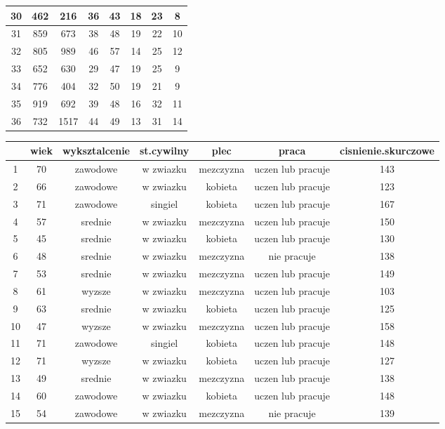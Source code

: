\documentclass[12pt]{report}\usepackage[]{graphicx}\usepackage[]{color}
\begin{document}
\begin{table}[ht!]
\begin{tabular}{c|c|c|c|c|c|c|c}
 \hline
30 & 462& 216& 36& 43& 18& 23& 8 \\
 \hline
31 & 859& 673& 38& 48& 19& 22& 10 \\
 \hline
32 & 805& 989& 46& 57& 14& 25& 12 \\
 \hline
33 & 652& 630& 29& 47& 19& 25& 9 \\
 \hline
34 & 776& 404& 32& 50& 19& 21& 9 \\
 \hline
35 & 919& 692& 39& 48& 16& 32& 11 \\
 \hline
36 & 732& 1517& 44& 49& 13& 31& 14 \\
 \end{tabular}
\end{table}\begin{table}[ht!]
\centering
 \begin{tabular}{c|c|c|c|c|c|c} 
 &  wiek & wyksztalcenie & st.cywilny & plec & praca & cisnienie.skurczowe \\ \hline
1 & 70& zawodowe& w zwiazku& mezczyzna& uczen lub pracuje& 143 \\
 \hline
2 & 66& zawodowe& w zwiazku& kobieta& uczen lub pracuje& 123 \\
 \hline
3 & 71& zawodowe& singiel& kobieta& uczen lub pracuje& 167 \\
 \hline
4 & 57& srednie& w zwiazku& mezczyzna& uczen lub pracuje& 150 \\
 \hline
5 & 45& srednie& w zwiazku& kobieta& uczen lub pracuje& 130 \\
 \hline
6 & 48& srednie& w zwiazku& mezczyzna& nie pracuje& 138 \\
 \hline
7 & 53& srednie& w zwiazku& mezczyzna& uczen lub pracuje& 149 \\
 \hline
8 & 61& wyzsze& w zwiazku& mezczyzna& uczen lub pracuje& 103 \\
 \hline
9 & 63& srednie& w zwiazku& kobieta& uczen lub pracuje& 125 \\
 \hline
10 & 47& wyzsze& w zwiazku& mezczyzna& uczen lub pracuje& 158 \\
 \hline
11 & 71& zawodowe& singiel& kobieta& uczen lub pracuje& 148 \\
 \hline
12 & 71& wyzsze& w zwiazku& kobieta& uczen lub pracuje& 127 \\
 \hline
13 & 49& srednie& w zwiazku& mezczyzna& uczen lub pracuje& 138 \\
 \hline
14 & 60& zawodowe& w zwiazku& kobieta& uczen lub pracuje& 148 \\
 \hline
15 & 54& zawodowe& w zwiazku& mezczyzna& nie pracuje& 139 \\

\end{tabular}
\end{table}
\end{document}

